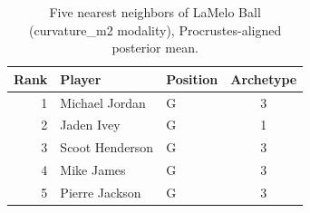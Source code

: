 \begin{table}[htbp]
  \centering\small
  \begin{tabular}{rllc}
    \toprule
    Rank & Player & Position & Archetype \\
    \midrule
    1 & Michael Jordan & G & 3 \\
    2 & Jaden Ivey & G & 1 \\
    3 & Scoot Henderson & G & 3 \\
    4 & Mike James & G & 3 \\
    5 & Pierre Jackson & G & 3 \\
    \bottomrule
  \end{tabular}
  \caption{Five nearest neighbors of LaMelo Ball (curvature_m2 modality), Procrustes-aligned posterior mean.}
  \label{tab:LaMelo_Ball_neighbors_curvature_m2}
\end{table}

